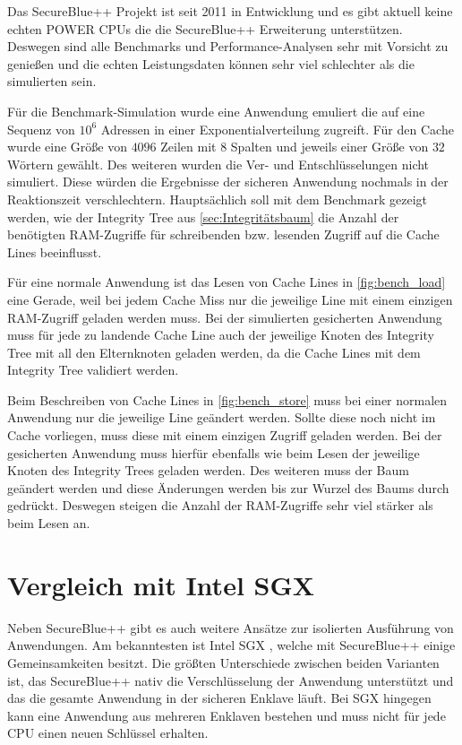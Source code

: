 \documentclass[ngerman]{sig-alternate-05-2015}
\begin{document}
Das SecureBlue++ Projekt ist seit 2011 in Entwicklung und es gibt aktuell keine echten POWER CPUs die die SecureBlue++ Erweiterung unterstützen. Deswegen sind alle Benchmarks und Performance-Analysen sehr mit Vorsicht zu genießen und die echten Leistungsdaten können sehr viel schlechter als die simulierten sein.

Für die Benchmark-Simulation wurde eine Anwendung emuliert die auf eine Sequenz von $10^6$ Adressen in einer Exponentialverteilung zugreift. Für den Cache wurde eine Größe von $4096$ Zeilen mit $8$ Spalten und jeweils einer Größe von $32$ Wörtern gewählt. Des weiteren wurden die Ver- und Entschlüsselungen nicht simuliert. Diese würden die Ergebnisse der sicheren Anwendung nochmals in der Reaktionszeit verschlechtern. Hauptsächlich soll mit dem Benchmark gezeigt werden, wie der Integrity Tree aus \cref{sec:Integritätsbaum} die Anzahl der benötigten RAM-Zugriffe für schreibenden bzw. lesenden Zugriff auf die Cache Lines beeinflusst.

Für eine normale Anwendung ist das Lesen von Cache Lines in \cref{fig:bench_load} eine  Gerade, weil bei jedem Cache Miss nur die jeweilige Line mit einem einzigen RAM-Zugriff geladen werden muss. Bei der simulierten gesicherten Anwendung muss für jede zu landende Cache Line auch der jeweilige Knoten des Integrity Tree mit all den Elternknoten geladen werden, da die Cache Lines mit dem Integrity Tree validiert werden. 

Beim Beschreiben von Cache Lines in \cref{fig:bench_store} muss bei einer normalen Anwendung nur die jeweilige Line geändert werden. Sollte diese noch nicht im Cache vorliegen, muss diese mit einem einzigen Zugriff geladen werden. Bei der gesicherten Anwendung muss hierfür ebenfalls wie beim Lesen der jeweilige Knoten des Integrity Trees geladen werden. Des weiteren muss der Baum geändert werden und diese Änderungen werden bis zur Wurzel des Baums durch gedrückt. Deswegen steigen die Anzahl der RAM-Zugriffe sehr viel stärker als beim Lesen an.

\section{Vergleich mit Intel SGX}

Neben SecureBlue++ gibt es auch weitere Ansätze zur isolierten Ausführung von Anwendungen. Am bekanntesten ist Intel SGX \cite{costanintel}, welche mit SecureBlue++ einige Gemeinsamkeiten besitzt. Die größten Unterschiede zwischen beiden Varianten ist, das SecureBlue++ nativ die Verschlüsselung der Anwendung unterstützt und das die gesamte Anwendung in der sicheren Enklave läuft. Bei SGX hingegen kann eine Anwendung aus mehreren Enklaven bestehen und muss nicht für jede CPU einen neuen Schlüssel erhalten.
\end{document}
